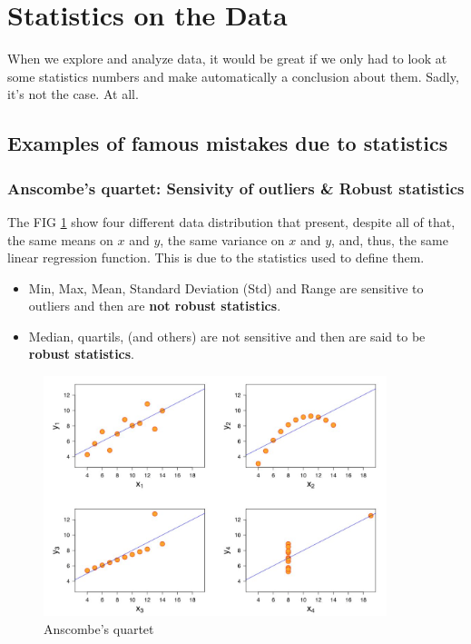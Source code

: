 
\section{Statistics on the Data}

When we explore and analyze data, it would be great if we only had to look at some statistics numbers and make automatically a conclusion about them. Sadly, it's not the case. At all.
\subsection{Examples of famous mistakes due to statistics}

\subsubsection{Anscombe's quartet: Sensivity of outliers \& Robust statistics}

The FIG \ref{pic:anscombe} show four different data distribution that present, despite all of that, the same means on $x$ and $y$, the same variance on $x$ and $y$, and, thus, the same linear regression function. This is due to the statistics used to define them. 

\begin{itemize}
    \item Min, Max, Mean, Standard Deviation (Std) and Range are sensitive to outliers and then are \textbf{not robust statistics}.
    \item Median, quartils, (and others) are not sensitive and then are said to be \textbf{robust statistics}. 
\end{itemize}



\begin{figure}[h]%
 \centering
 \includegraphics[width=10cm]{./pic/anscombe}
 \caption{\label{pic:anscombe} Anscombe's quartet}
\end{figure}

